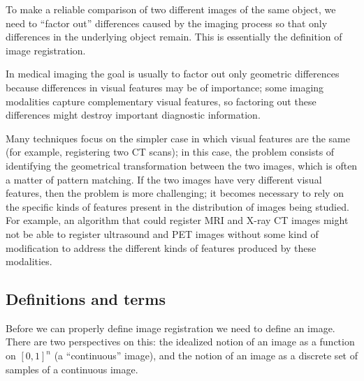 \documentclass{article}
\begin{document}
	To make a reliable comparison of two different images of the same object, we need to ``factor out'' differences caused by the imaging process so that only differences in the underlying object remain. This is essentially the definition of image registration.
	
 	In medical imaging the goal is usually to factor out only geometric differences because differences in visual features may be of importance; some imaging modalities capture complementary visual features, so factoring out these differences might destroy important diagnostic information.
	
	Many techniques focus on the simpler case in which visual features are the same (for example, registering two CT scans); in this case, the problem consists of identifying the geometrical transformation between the two images, which is often a matter of pattern matching. If the two images have very different visual features, then the problem is more challenging; it becomes necessary to rely on the specific kinds of features present in the distribution of images being studied. For example, an algorithm that could register MRI and X-ray CT images might not be able to register ultrasound and PET images without some kind of modification to address the different kinds of features produced by these modalities.
	
	\subsection{Definitions and terms}
	Before we can properly define image registration we need to define an image. There are two perspectives on this: the idealized notion of an image as a function on \([0,1]^n\) (a ``continuous'' image), and the notion of an image as a discrete set of samples of a continuous image.
	
\end{document}
